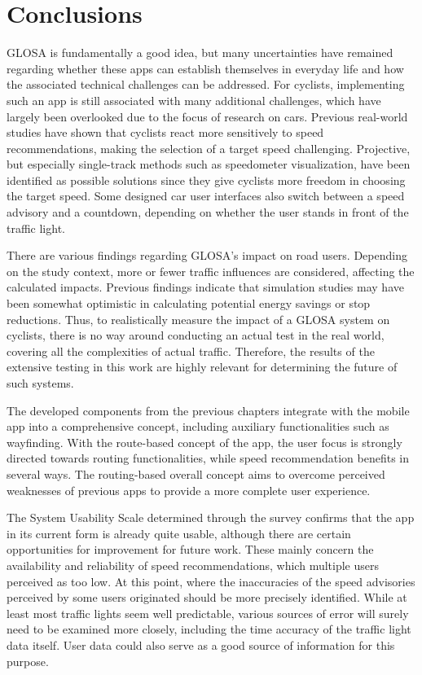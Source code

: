 \section{Conclusions}

GLOSA is fundamentally a good idea, but many uncertainties have remained regarding whether these apps can establish themselves in everyday life and how the associated technical challenges can be addressed. For cyclists, implementing such an app is still associated with many additional challenges, which have largely been overlooked due to the focus of research on cars. Previous real-world studies have shown that cyclists react more sensitively to speed recommendations, making the selection of a target speed challenging. Projective, but especially single-track methods such as speedometer visualization, have been identified as possible solutions since they give cyclists more freedom in choosing the target speed. Some designed car user interfaces also switch between a speed advisory and a countdown, depending on whether the user stands in front of the traffic light.

There are various findings regarding GLOSA's impact on road users. Depending on the study context, more or fewer traffic influences are considered, affecting the calculated impacts. Previous findings indicate that simulation studies may have been somewhat optimistic in calculating potential energy savings or stop reductions. Thus, to realistically measure the impact of a GLOSA system on cyclists, there is no way around conducting an actual test in the real world, covering all the complexities of actual traffic. Therefore, the results of the extensive testing in this work are highly relevant for determining the future of such systems.

The developed components from the previous chapters integrate with the mobile app into a comprehensive concept, including auxiliary functionalities such as wayfinding. With the route-based concept of the app, the user focus is strongly directed towards routing functionalities, while speed recommendation benefits in several ways. The routing-based overall concept aims to overcome perceived weaknesses of previous apps to provide a more complete user experience.

The System Usability Scale determined through the survey confirms that the app in its current form is already quite usable, although there are certain opportunities for improvement for future work. These mainly concern the availability and reliability of speed recommendations, which multiple users perceived as too low. At this point, where the inaccuracies of the speed advisories perceived by some users originated should be more precisely identified. While at least most traffic lights seem well predictable, various sources of error will surely need to be examined more closely, including the time accuracy of the traffic light data itself. User data could also serve as a good source of information for this purpose.

